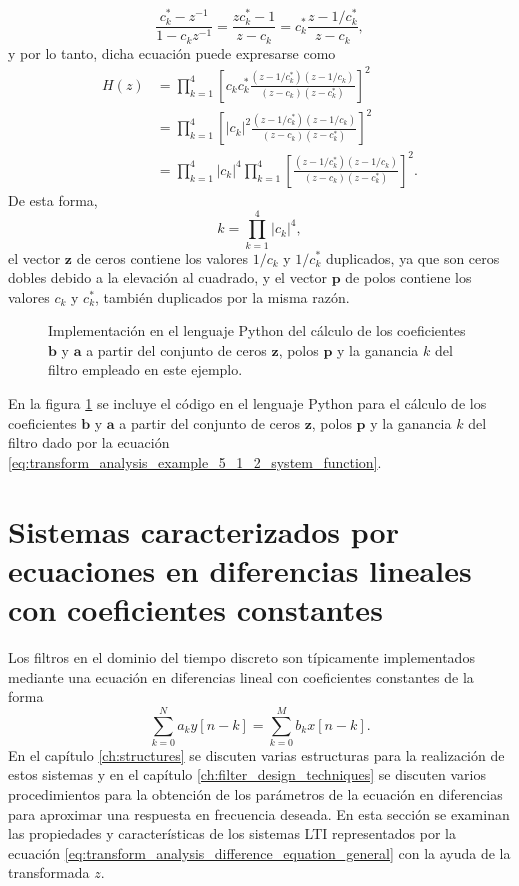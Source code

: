 \documentclass[a4paper]{report}
\newcommand{\z}{\mathbf{z}}
\begin{document}
\[
 \frac{c^*_k-z^{-1}}{1-c_kz^{-1}}=\frac{zc^*_k-1}{z-c_k}=c^*_k\frac{z-1/c^*_k}{z-c_k},
\]
y por lo tanto, dicha ecuación puede expresarse como
\begin{align*}
 H(z)&=\prod_{k=1}^4\left[c_kc^*_k\frac{(z-1/c^*_k)(z-1/c_k)}{(z-c_k)(z-c^*_k)}\right]^2\\
  &=\prod_{k=1}^4\left[|c_k|^2\frac{(z-1/c^*_k)(z-1/c_k)}{(z-c_k)(z-c^*_k)}\right]^2\\
  &=\prod_{k=1}^4|c_k|^4\prod_{k=1}^4\left[\frac{(z-1/c^*_k)(z-1/c_k)}{(z-c_k)(z-c^*_k)}\right]^2. 
\end{align*}
De esta forma,
\[
 k=\prod_{k=1}^4|c_k|^4,
\]
el vector \(\z\) de ceros contiene los valores \(1/c_k\) y \(1/c^*_k\) duplicados, ya que son ceros dobles debido a la elevación al cuadrado, y el vector \(\mathbf{p}\) de polos contiene los valores \(c_k\) y \(c^*_k\), también duplicados por la misma razón.
\begin{figure}
\begin{center}

\caption{\label{fig:transform_analysis_filter_ba_coefs_from_zpk} Implementación en el lenguaje Python del cálculo de los coeficientes \(\mathbf{b}\) y \(\mathbf{a}\) a partir del conjunto de ceros \(\z\), polos \(\mathbf{p}\) y la ganancia \(k\) del filtro empleado en este ejemplo.}
\end{center}
\end{figure}
En la figura \ref{fig:transform_analysis_filter_ba_coefs_from_zpk} se incluye el código en el lenguaje Python para el cálculo de los coeficientes \(\mathbf{b}\) y \(\mathbf{a}\) a partir del conjunto de ceros \(\z\), polos \(\mathbf{p}\) y la ganancia \(k\) del filtro dado por la ecuación \ref{eq:transform_analysis_example_5_1_2_system_function}.

\section{Sistemas caracterizados por ecuaciones en diferencias lineales con coeficientes constantes}

Los filtros en el dominio del tiempo discreto son típicamente implementados mediante una ecuación en diferencias lineal con coeficientes constantes de la forma
\begin{equation}\label{eq:transform_analysis_difference_equation_general}
 \sum_{k=0}^Na_ky[n-k]=\sum_{k=0}^Mb_kx[n-k]. 
\end{equation}
En el capítulo \ref{ch:structures} se discuten varias estructuras para la realización de estos sistemas y en el capítulo \ref{ch:filter_design_techniques} se discuten varios procedimientos para la obtención de los parámetros de la ecuación en diferencias para aproximar una respuesta en frecuencia deseada. En esta sección se examinan las propiedades y características de los sistemas LTI representados por la ecuación \ref{eq:transform_analysis_difference_equation_general} con la ayuda de la transformada \(z\).
\end{document}
